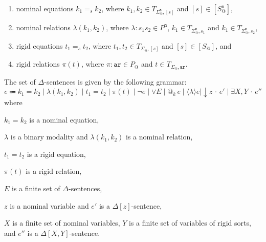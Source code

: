 \documentclass{article}
\makeatletter
\newcommand{\ari}{\mathtt{ar}}
\newcommand{\nom}{\mathtt{n}}
\newcommand{\at}[1]{@_{#1}\,}
\newcommand{\pos}[1]{\langle #1 \rangle}
\newcommand{\store}[1]{{\downarrow}#1\,{\cdot}\,}
\newcommand{\Exists}[1]{\exists #1\,{\cdot}\,}
\makeatother
\begin{document}
\begin{enumerate}
 \item nominal equations $k_1=_s k_2$, where $k_1,k_2\in T_{\Sigma^\nom_@,[s]}$ and $[s]\in [S^\nom_@]$,

 \item nominal relations $\lambda(k_1,k_2)$, where $\lambda \colon s_1 s_2\in P^\nom$,  $k_1\in T_{\Sigma^\nom_@,s_1}$ and $k_1\in T_{\Sigma^\nom_@,s_2}$,

 \item rigid equations $t_1=_s t_2$, where $t_1,t_2\in T_{\Sigma_@,[s]}$ and $[s]\in [S_@]$, and

 \item rigid relations $\pi(t)$, where $\pi\colon\ari \in P_@$ and $t\in T_{\Sigma_@,\ari}$.
\end{enumerate}
 The set of $\Delta$-sentences is given by the following grammar:
$$e\Coloneqq k_1=k_2 \mid\lambda(k_1,k_2)\mid t_1=t_2 \mid \pi(t) \mid  \neg e\mid \vee E\mid \at{k} e\mid \pos{\lambda}e \mid \store{z}e'\mid \Exists{X,Y}e''$$
where 
\begin{enumerate*}[label=(\alph*)]
 \item $k_1=k_2$ is a nominal equation,
 \item $\lambda$ is a binary modality and $\lambda(k_1,k_2)$ is a nominal relation,
 \item $t_1=t_2$ is a rigid equation,
 \item $\pi(t)$ is a rigid relation,
 \item $E$ is a finite set of $\Delta$-sentences,
 \item $z$ is a nominal variable and $e'$ is a $\Delta[z]$-sentence,
 \item $X$ is a finite set of nominal variables,
       $Y$ is a finite set of variables of rigid sorts, and
       $e''$ is a $\Delta[X,Y]$-sentence.
\end{enumerate*}


\end{document}
